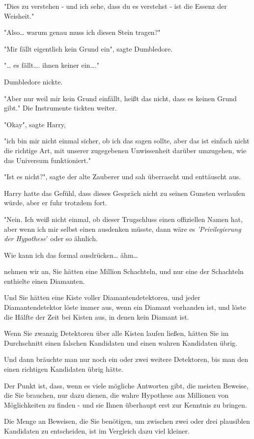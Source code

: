 {"Dies zu verstehen - und ich sehe, dass du es verstehst - ist die Essenz der Weisheit."

"Also… warum genau muss ich diesen Stein tragen?"

"Mir fällt eigentlich kein Grund ein", sagte Dumbledore.

"… es fällt…. ihnen keiner ein…."

Dumbledore nickte.

"Aber nur weil mir kein Grund einfällt, heißt das nicht, dass es keinen Grund gibt." Die Instrumente tickten weiter.

"Okay", sagte Harry,

"ich bin mir nicht einmal sicher, ob ich das sagen sollte, aber das ist einfach nicht die richtige Art, mit unserer zugegebenen Unwissenheit darüber umzugehen, wie das Universum funktioniert."

"Ist es nicht?", sagte der alte Zauberer und sah überrascht und enttäuscht aus.

Harry hatte das Gefühl, dass dieses Gespräch nicht zu seinen Gunsten verlaufen würde, aber er fuhr trotzdem fort.

"Nein. Ich weiß nicht einmal, ob dieser Trugschluss einen offiziellen Namen hat, aber wenn ich mir selbst einen ausdenken müsste, dann wäre es \emph{'Privilegierung der Hypothese}' oder so ähnlich.

Wie kann ich das formal ausdrücken… ähm…

nehmen wir an, Sie hätten eine Million Schachteln, und nur eine der Schachteln enthielte einen Diamanten.

Und Sie hätten eine Kiste voller Diamantendetektoren, und jeder Diamantendetektor löste immer aus, wenn ein Diamant vorhanden ist, und löste die Hälfte der Zeit bei Kisten aus, in denen kein Diamant ist.

Wenn Sie zwanzig Detektoren über alle Kisten laufen ließen, hätten Sie im Durchschnitt einen falschen Kandidaten und einen wahren Kandidaten übrig.

Und dann bräuchte man nur noch ein oder zwei weitere Detektoren, bis man den einen richtigen Kandidaten übrig hätte.

Der Punkt ist, dass, wenn es viele mögliche Antworten gibt, die meisten Beweise, die Sie brauchen, nur dazu dienen, die wahre Hypothese aus Millionen von Möglichkeiten zu finden - und sie Ihnen überhaupt erst zur Kenntnis zu bringen.

Die Menge an Beweisen, die Sie benötigen, um zwischen zwei oder drei plausiblen Kandidaten zu entscheiden, ist im Vergleich dazu viel kleiner.

}
